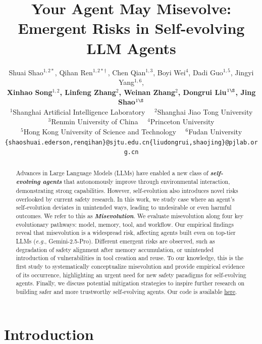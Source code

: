 \documentclass{article} %
\title{Your Agent May Misevolve: Emergent Risks in Self-evolving LLM Agents}
\author{%
  Shuai Shao$^{1,2*}$, Qihan Ren$^{1,2*\dagger}$\,, Chen Qian$^{1,3}$, Boyi Wei$^4$, Dadi Guo$^{1,5}$,
  Jingyi Yang$^{1,6}$,\\
  \textbf{Xinhao Song$^{1,2}$, Linfeng Zhang$^2$, Weinan Zhang$^2$, Dongrui Liu$^{1\S}$, Jing Shao$^{1\S}$}\\
  $^1$Shanghai Artificial Intelligence Laboratory \ \ $^2$Shanghai Jiao Tong University\\ 
  $^3$Renmin University of China \ \ $^4$Princeton University \\
  $^5$Hong Kong University of Science and Technology \ \ $^6$Fudan University\\
  {\fontsize{8}{9.6}\selectfont \texttt{\{shaoshuai.ederson,renqihan\}@sjtu.edu.cn}\quad \texttt{\{liudongrui,shaojing\}@pjlab.org.cn}}\\
}
\begin{document}
\maketitle



{
\let\thefootnote\relax
{}
}


\begin{abstract}
Advances in Large Language Models (LLMs) have enabled a new class of \textbf{\textit{self-evolving agents}} that autonomously improve through environmental interaction, demonstrating strong capabilities.
However, self-evolution also introduces novel risks overlooked by current safety research. In this work, we study case where an agent's self-evolution deviates in unintended ways, leading to undesirable or even harmful outcomes. We refer to this as \textit{\textbf{Misevolution}}.
We evaluate misevolution along four key evolutionary pathways: model, memory, tool, and workflow. 
Our empirical findings reveal that misevolution is a widespread risk, affecting agents built even on top-tier LLMs (\textit{e.g.}, Gemini-2.5-Pro).
Different emergent risks are observed, such as degradation of safety alignment after memory accumulation, or unintended introduction of vulnerabilities in tool creation and reuse. 
To our knowledge, this is the first study to systematically conceptualize misevolution and provide empirical evidence of its occurrence, highlighting an urgent need for new safety paradigms for self-evolving agents. Finally, we discuss potential mitigation strategies to inspire further research on building safer and more trustworthy self-evolving agents. Our code is available \href{https://github.com/ShaoShuai0605/Misevolution}{here}.

\end{abstract}



\section{Introduction}
\end{document}
